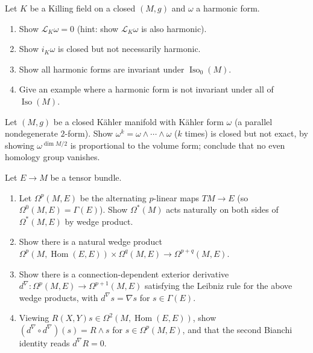 \begin{remark}[Exercise 9.6.14]
  \label{rem:pet-ch9-exercise-9-6-14}
  Let $K$ be a Killing field on a closed $(M,g)$ and $\omega$ a harmonic form.
  \begin{enumerate}
    \item[(1)] Show $\mathcal{L}_K\omega=0$ (hint: show $\mathcal{L}_K\omega$
      is also harmonic).
    \item[(2)] Show $i_K\omega$ is closed but not necessarily harmonic.
    \item[(3)] Show all harmonic forms are invariant under $\operatorname{Iso}_0(M)$.
    \item[(4)] Give an example where a harmonic form is not invariant under
      all of $\operatorname{Iso}(M)$.
  \end{enumerate}
\end{remark}

\begin{remark}[Exercise 9.6.15]
  \label{rem:pet-ch9-exercise-9-6-15}
  Let $(M,g)$ be a closed K\"ahler manifold with K\"ahler form $\omega$ (a
  parallel nondegenerate $2$-form). Show $\omega^k=\omega\wedge\cdots\wedge
  \omega$ ($k$ times) is closed but not exact, by showing
  $\omega^{\dim M/2}$ is proportional to the volume form; conclude that no
  even homology group vanishes.
\end{remark}

\begin{remark}[Exercise 9.6.16]
  \label{rem:pet-ch9-exercise-9-6-16}
  Let $E\to M$ be a tensor bundle.
  \begin{enumerate}
    \item[(1)] Let $\Omega^p(M,E)$ be the alternating $p$-linear maps
      $TM\to E$ (so $\Omega^0(M,E)=\Gamma(E)$). Show $\Omega^*(M)$ acts
      naturally on both sides of $\Omega^*(M,E)$ by wedge product.
    \item[(2)] Show there is a natural wedge product
      $\Omega^p(M,\operatorname{Hom}(E,E))\times\Omega^q(M,E)\to\Omega^{p+q}(M,E)$.
    \item[(3)] Show there is a connection-dependent exterior derivative
      $d^\nabla:\Omega^p(M,E)\to\Omega^{p+1}(M,E)$ satisfying the Leibniz rule
      for the above wedge products, with $d^\nabla s=\nabla s$ for
      $s\in\Gamma(E)$.
    \item[(4)] Viewing $R(X,Y)s\in\Omega^2(M,\operatorname{Hom}(E,E))$, show
      $(d^\nabla\circ d^\nabla)(s)=R\wedge s$ for $s\in\Omega^p(M,E)$, and that
      the second Bianchi identity reads $d^\nabla R=0$.
  \end{enumerate}
\end{remark}

